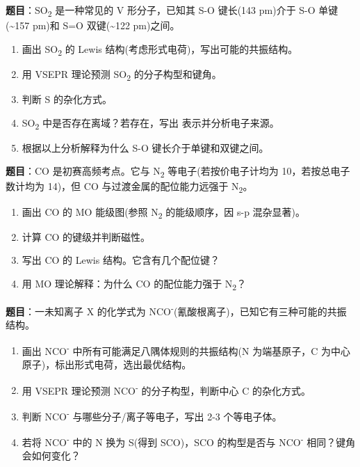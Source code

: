 \textbf{题目}：SO\textsubscript{2} 是一种常见的 V 形分子，已知其 S-O 键长(143 pm)介于 S-O 单键(\textasciitilde157 pm)和 S=O 双键(\textasciitilde122 pm)之间。

\begin{enumerate}
\def\labelenumi{(\arabic{enumi})}
\tightlist
\item
  画出 SO\textsubscript{2} 的 Lewis 结构(考虑形式电荷)，写出可能的共振结构。
\item
  用 VSEPR 理论预测 SO\textsubscript{2} 的分子构型和键角。
\item
  判断 S 的杂化方式。
\item
  SO\textsubscript{2} 中是否存在离域？若存在，写出  表示并分析电子来源。
\item
  根据以上分析解释为什么 S-O 键长介于单键和双键之间。
\end{enumerate}

\textbf{题目}：CO 是初赛高频考点。它与 N\textsubscript{2} 等电子(若按价电子计均为 10，若按总电子数计均为 14)，但 CO 与过渡金属的配位能力远强于 N\textsubscript{2}。

\begin{enumerate}
\def\labelenumi{(\arabic{enumi})}
\tightlist
\item
  画出 CO 的 MO 能级图(参照 N\textsubscript{2} 的能级顺序，因 s-p 混杂显著)。
\item
  计算 CO 的键级并判断磁性。
\item
  写出 CO 的 Lewis 结构。它含有几个配位键？
\item
  用 MO 理论解释：为什么 CO 的配位能力强于 N\textsubscript{2}？
\end{enumerate}

\textbf{题目}：一未知离子 X 的化学式为 NCO\textsuperscript{-}(氰酸根离子)，已知它有三种可能的共振结构。

\begin{enumerate}
\def\labelenumi{(\arabic{enumi})}
\tightlist
\item
  画出 NCO\textsuperscript{-} 中所有可能满足八隅体规则的共振结构(N 为端基原子，C 为中心原子)，标出形式电荷，选出最优结构。
\item
  用 VSEPR 理论预测 NCO\textsuperscript{-} 的分子构型，判断中心 C 的杂化方式。
\item
  判断 NCO\textsuperscript{-} 与哪些分子/离子等电子，写出 2-3 个等电子体。
\item
  若将 NCO\textsuperscript{-} 中的 N 换为 S(得到 SCO)，SCO 的构型是否与 NCO\textsuperscript{-} 相同？键角会如何变化？
\end{enumerate}

